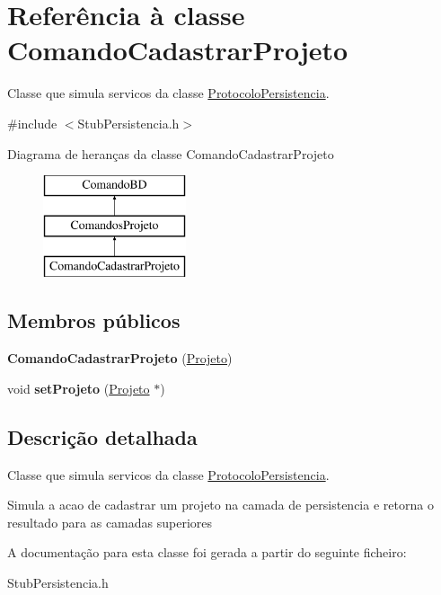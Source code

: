\hypertarget{class_comando_cadastrar_projeto}{
\section{\-Referência à classe \-Comando\-Cadastrar\-Projeto}
\label{class_comando_cadastrar_projeto}
}


\-Classe que simula servicos da classe \hyperlink{class_protocolo_persistencia}{\-Protocolo\-Persistencia}.  




{\ttfamily \#include $<$\-Stub\-Persistencia.\-h$>$}

\-Diagrama de heranças da classe \-Comando\-Cadastrar\-Projeto\begin{figure}[H]
\begin{center}
\leavevmode
\includegraphics[height=3.000000cm]{class_comando_cadastrar_projeto}
\end{center}
\end{figure}
\subsection*{\-Membros públicos}
\begin{DoxyCompactItemize}
\item 
\hypertarget{class_comando_cadastrar_projeto_a701d928b8a27c64996dcc8f94218f04e}{
{\bfseries \-Comando\-Cadastrar\-Projeto} (\hyperlink{class_projeto}{\-Projeto})}
\label{class_comando_cadastrar_projeto_a701d928b8a27c64996dcc8f94218f04e}

\item 
\hypertarget{class_comando_cadastrar_projeto_a8345be1b262eca747cd3f5dea9d3f85b}{
void {\bfseries set\-Projeto} (\hyperlink{class_projeto}{\-Projeto} $\ast$)}
\label{class_comando_cadastrar_projeto_a8345be1b262eca747cd3f5dea9d3f85b}

\end{DoxyCompactItemize}


\subsection{\-Descrição detalhada}
\-Classe que simula servicos da classe \hyperlink{class_protocolo_persistencia}{\-Protocolo\-Persistencia}. 

\-Simula a acao de cadastrar um projeto na camada de persistencia e retorna o resultado para as camadas superiores 

\-A documentação para esta classe foi gerada a partir do seguinte ficheiro\-:\begin{DoxyCompactItemize}
\item 
\-Stub\-Persistencia.\-h\end{DoxyCompactItemize}
